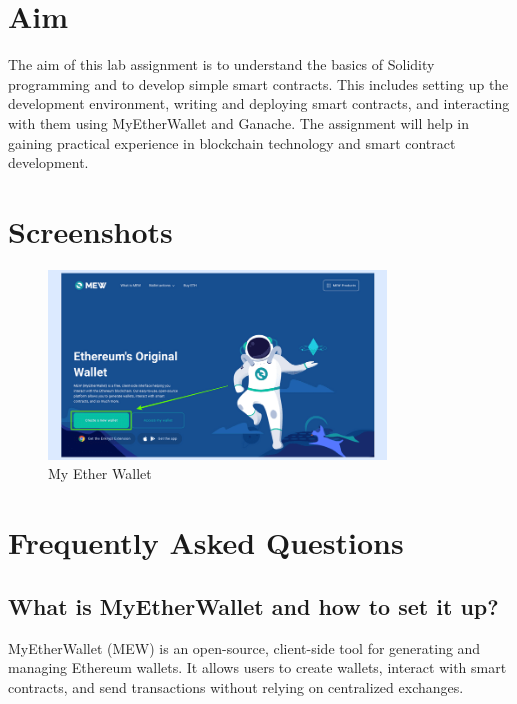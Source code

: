\documentclass[11pt]{article}
\begin{document}
\tableofcontents
\thispagestyle{empty}
\clearpage

\setcounter{page}{1}

\section{Aim}
The aim of this lab assignment is to understand the basics of Solidity programming and to develop simple smart contracts. This includes setting up the development environment, writing and deploying smart contracts, and interacting with them using MyEtherWallet and Ganache. The assignment will help in gaining practical experience in blockchain technology and smart contract development.

\section{Screenshots}

\begin{figure}[H]
    \centering
    \includegraphics[width=0.8\textwidth]{1.png}
    \caption{My Ether Wallet}
    \label{fig:1}
\end{figure}

\section{Frequently Asked Questions}

\subsection{What is MyEtherWallet and how to set it up?}

MyEtherWallet (MEW) is an open-source, client-side tool for generating and managing Ethereum wallets. It allows users to create wallets, interact with smart contracts, and send transactions without relying on centralized exchanges.
\end{document}

